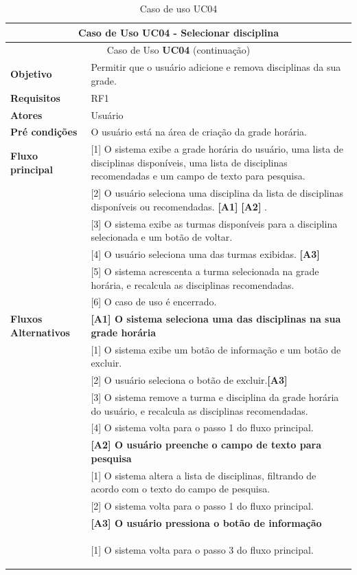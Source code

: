 \begin{longtable}{ | m{} | m{} | }
    
    \hline\hline
    \multicolumn{2}{|c|}{Caso de Uso \textbf{UC04} - Selecionar disciplina}\tabularnewline\hline\hline\endfirsthead
    \hline\hline
    \multicolumn{2}{|c|}{Caso de Uso \textbf{UC04} (continuação)}\tabularnewline\hline\hline\endhead
    \hline\endfoot
    \hline\caption{Caso de uso UC04}\endlastfoot

    \textbf{Objetivo} & Permitir que o usuário adicione e remova disciplinas da sua grade.\tabularnewline\hline
    \textbf{Requisitos} & RF1\tabularnewline\hline
    \textbf{Atores} & Usuário\tabularnewline\hline
    \textbf{Pré condições} & O usuário está na área de criação da grade horária.\tabularnewline\hline

    \multirow{1}{*}{\textbf{Fluxo principal}} & [1] O sistema exibe a grade horária do usuário, uma lista de disciplinas disponíveis, uma lista de disciplinas recomendadas e um campo de texto para pesquisa.\tabularnewline\cline{2-2}
    & [2] O usuário seleciona uma disciplina da lista de disciplinas disponíveis ou recomendadas. \textbf{[A1]} \textbf{[A2]} .\tabularnewline\cline{2-2}
    & [3] O sistema exibe as turmas disponíveis para a disciplina selecionada e um botão de voltar.\tabularnewline\cline{2-2}
    & [4] O usuário seleciona uma das turmas exibidas. \textbf{[A3]}\tabularnewline\cline{2-2}
    & [5] O sistema acrescenta a turma selecionada na grade horária, e recalcula as disciplinas recomendadas. \tabularnewline\cline{2-2}
    & [6] O caso de uso é encerrado.\tabularnewline\hline

    \multirow{1}{*}{\textbf{Fluxos Alternativos}} & \textbf{[A1] O sistema seleciona uma das disciplinas na sua grade horária}\tabularnewline\cline{2-2}
    & [1] O sistema exibe um botão de informação e um botão de excluir.\tabularnewline\cline{2-2} 
    & [2] O usuário seleciona o botão de excluir.\textbf{[A3]}\tabularnewline\cline{2-2} 
    & [3] O sistema remove a turma e disciplina da grade horária do usuário, e recalcula as disciplinas recomendadas. \tabularnewline\cline{2-2}
    & [4] O sistema volta para o passo 1 do fluxo principal. \tabularnewline\cline{2-2}

    & \textbf{[A2] O usuário preenche o campo de texto para pesquisa}\tabularnewline\cline{2-2}
    & [1] O sistema altera a lista de disciplinas, filtrando de acordo com o texto do campo de pesquisa. \tabularnewline\cline{2-2}
    & [2] O sistema volta para o passo 1 do fluxo principal. \tabularnewline\cline{2-2}

    & \textbf{[A3] O usuário pressiona o botão de informação}\tabularnewline\cline{2-2}
    & [1] O sistema volta para o passo 3 do fluxo principal. %

    \label{tab:uc04}
\end{longtable}


